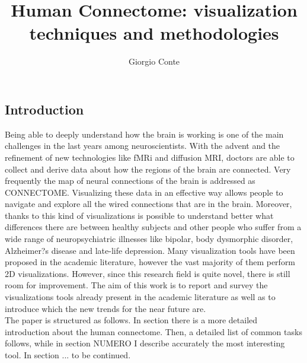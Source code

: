 \documentclass{article}
\title{Human Connectome: visualization techniques and methodologies}
\author{Giorgio Conte}
\affil{Creative Coding Lab\\ Department of Computer Science\\University of Illinois at Chicago}
\begin{document}
\maketitle
\begin{abstract}
\end{abstract}

\begin{multicols}{2}
\raggedcolumns

\section{Introduction}

Being able to deeply understand how the brain is working is one of the main challenges in the last years among neuroscientists. With the advent and the refinement of new technologies like fMRi and diffusion MRI, doctors are able to collect and derive data about how the regions of the brain are connected. Very frequently the map of neural connections of the brain is addressed as CONNECTOME.
Visualizing these data in an effective way allows people to navigate and explore all the wired connections that are in the brain. Moreover, thanks to this kind of visualizations is possible to understand better what differences there are between healthy subjects and other people who suffer from a wide range of neuropsychiatric illnesses like bipolar, body dysmorphic disorder, Alzheimer?s disease and late-life depression. 
Many visualization tools have been proposed in the academic literature, however the vast majority of them perform 2D visualizations. However, since this research field is quite novel, there is still room for improvement.
The aim of this work is to report and survey the visualizations tools already present in the academic literature as well as to introduce which the new trends for the near future are.\\
The paper is structured as follows. In section there is a more detailed introduction about the human connectome. Then, a detailed list of common tasks follows, while in section NUMERO I describe accurately the most interesting tool. In section ... to be continued.

\end{multicols}
\end{document}
